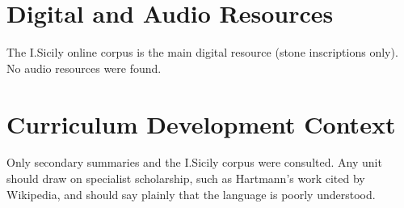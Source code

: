 \documentclass[12pt]{article}
\begin{document}
\section{Digital and Audio Resources}
The I.Sicily online corpus is the main digital resource (stone inscriptions only). No audio resources were found.

\section{Curriculum Development Context}
Only secondary summaries and the I.Sicily corpus were consulted. Any unit should draw on specialist scholarship, such as Hartmann's work cited by Wikipedia, and should say plainly that the language is poorly understood.
\end{document}
